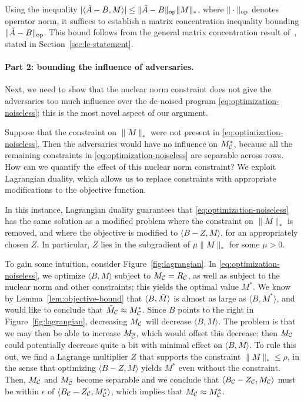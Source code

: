 Using the inequality $|\langle \tilde{A} - B, M \rangle| \leq \|\tilde{A}-B\|_{\mathrm{op}}\|M\|_*$, 
where $\|\cdot\|_{\mathrm{op}}$ denotes operator norm, it suffices to establish a matrix 
concentration inequality bounding $\|\tilde{A} - B\|_{\mathrm{op}}$.   
This bound follows from the general matrix concentration result of~\cite{le2015concentration},
stated in Section~\ref{sec:le-statement}.

\paragraph{Part 2: bounding the influence of adversaries.} 
Next, we need to show that the nuclear norm constraint does 
not give the adversaries too much influence over the de-noised program 
\eqref{eq:optimization-noiseless}; this is the most novel aspect 
of our argument.

Suppose that the constraint on $\|M\|_*$ were not present in 
\eqref{eq:optimization-noiseless}. Then the adversaries would have 
no influence on $M^*_{\mathcal{C}}$, because all the remaining constraints 
in \eqref{eq:optimization-noiseless} are separable across rows. 
How can we quantify the effect of this nuclear norm constraint?
We exploit Lagrangian duality, which allows us to replace constraints 
with appropriate modifications to the objective function.



In this instance, 
Lagrangian duality guarantees that \eqref{eq:optimization-noiseless} has the 
same solution as a modified problem where the constraint on $\|M\|_*$ is removed, 
and where the objective is modified to $\langle B - Z, M \rangle$, for an 
appropriately chosen $Z$. In particular, $Z$ lies in the subgradient of 
$\mu \|M\|_*$ for some $\mu > 0$.

To gain some intuition, consider 
Figure~\ref{fig:lagrangian}. In \eqref{eq:optimization-noiseless}, we optimize 
$\langle B, M \rangle$ subject to $M_{\mathcal{C}} = R_{\mathcal{C}}$, as well as subject to 
the nuclear norm and other constraints; this yields the optimal value $M^*$. 
We know by Lemma~\ref{lem:objective-bound} that $\langle B, \tilde{M} \rangle$ is almost 
as large as $\langle B, M^* \rangle$, and would like to conclude that 
$\tilde{M}_{\mathcal{C}} \approx M^*_{\mathcal{C}}$. Since $B$ points to the right in Figure~\ref{fig:lagrangian}, 
decreasing $M_{\mathcal{C}}$ will decrease $\langle B, M \rangle$. The problem is that 
we may then be able to increase $M_{\overline{\mathcal{C}}}$, which would offset 
this decrease; then $M_{\mathcal{C}}$ could potentially decrease quite a 
bit with minimal effect on $\langle B, M \rangle$. 
To rule this out, we find a Lagrange 
multiplier $Z$ that supports 
the constraint $\|M\|_* \leq \rho$, in the sense that optimizing 
$\langle B-Z, M \rangle$ yields $M^*$ even without the constraint. 
Then, $M_{\mathcal{C}}$ and $M_{\overline{\mathcal{C}}}$ become separable and we conclude that 
$\langle B_{\mathcal{C}} - Z_{\mathcal{C}}, M_{\mathcal{C}} \rangle$ must be within $\epsilon$ of 
$\langle B_{\mathcal{C}} - Z_{\mathcal{C}}, M^*_{\mathcal{C}} \rangle$, which implies that 
$M_{\mathcal{C}} \approx M^*_{\mathcal{C}}$.

